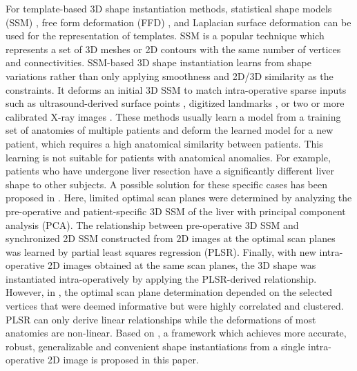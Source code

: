 \documentclass[review]{elsarticle}
\begin{document}
For template-based 3D shape instantiation methods, statistical shape models (SSM) \citep{frangi2002automatic}, free form deformation (FFD) \citep{koh2011reconstruction}, and Laplacian surface deformation \citep{karade20153d} can be used for the representation of templates. SSM \citep{cootes1995active} is a popular technique which represents a set of 3D meshes or 2D contours with the same number of vertices and connectivities. SSM-based 3D shape instantiation learns from shape variations rather than only applying smoothness and 2D/3D similarity as the constraints. It deforms an initial 3D SSM to match intra-operative sparse inputs such as ultrasound-derived surface points \citep{barratt2008instantiation}, digitized landmarks \citep{rajamani2007statistical}, or two or more calibrated X-ray images \citep{baka20112d}. These methods usually learn a model from a training set of anatomies of multiple patients and deform the learned model for a new patient, which requires a high anatomical similarity between patients. This learning is not suitable for patients with anatomical anomalies. For example, patients who have undergone liver resection have a significantly different liver shape to other subjects. A possible solution for these specific cases has been proposed  in \citep{lee2010dynamic}. Here, limited optimal scan planes were determined by analyzing the pre-operative and patient-specific 3D SSM of the liver with principal component analysis (PCA). The relationship between pre-operative 3D SSM and synchronized 2D SSM constructed from 2D images at the optimal scan planes was learned by partial least squares regression (PLSR). Finally, with new intra-operative 2D images obtained at the same scan planes, the 3D shape was instantiated intra-operatively by applying the PLSR-derived relationship. However, in \citep{lee2010dynamic}, the optimal scan plane determination depended on the selected vertices that were deemed informative but were highly correlated and clustered. PLSR can only derive linear relationships while the deformations of most anatomies are non-linear. Based on \citep{lee2010dynamic}, a framework which achieves more accurate, robust, generalizable and convenient shape instantiations from a single intra-operative 2D image is proposed in this paper.
\end{document}
